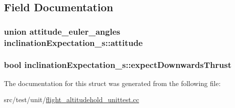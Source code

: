 \subsection{Field Documentation}
\hypertarget{structinclinationExpectation__s_a1b41512fcf82234335864f3ed020a739}{
\subsubsection[{attitude}]{\setlength{\rightskip}{0pt plus 5cm}union {\bf attitude\+\_\+euler\+\_\+angles} inclination\+Expectation\+\_\+s\+::attitude}}\label{structinclinationExpectation__s_a1b41512fcf82234335864f3ed020a739}
\hypertarget{structinclinationExpectation__s_a923e87d7d923f8a328ba15a25ae393d5}{
\subsubsection[{expect\+Downwards\+Thrust}]{\setlength{\rightskip}{0pt plus 5cm}bool inclination\+Expectation\+\_\+s\+::expect\+Downwards\+Thrust}}\label{structinclinationExpectation__s_a923e87d7d923f8a328ba15a25ae393d5}


The documentation for this struct was generated from the following file\+:\begin{DoxyCompactItemize}
\item 
src/test/unit/\hyperlink{flight__altitudehold__unittest_8cc}{flight\+\_\+altitudehold\+\_\+unittest.\+cc}\end{DoxyCompactItemize}
